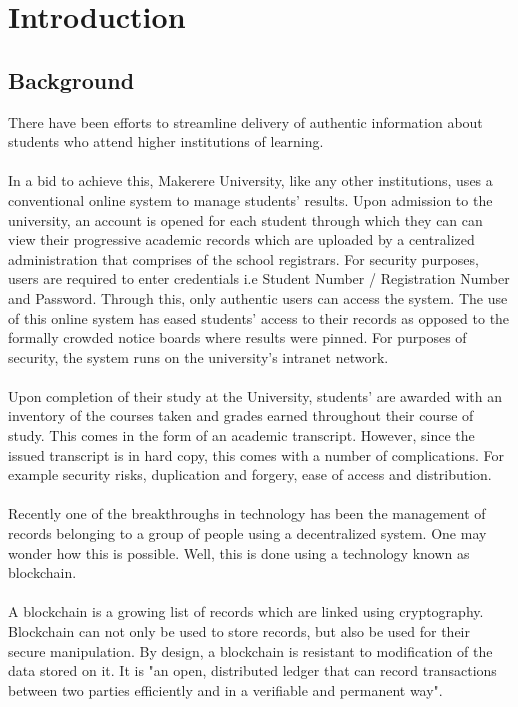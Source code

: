 \chapter{Introduction}

\section{Background}
There have been efforts to streamline delivery of authentic information about students who attend higher institutions of learning.\\\\
In a bid to achieve this, Makerere University, like any other institutions, uses a conventional online system to manage students' results. Upon admission to the university, an account is opened for each student through which they can can view their progressive academic records which are uploaded by a centralized administration that comprises of the school registrars. For security purposes, users are required to enter credentials i.e Student Number / Registration Number and Password. Through this, only authentic users can access the system. The use of this online system has eased students' access to their records as opposed to the formally crowded notice boards where results were pinned. For purposes of security, the system runs on the university's intranet network.\\\\
Upon completion of their study at the University, students' are awarded with an inventory of the courses taken and grades earned throughout their course of study. This comes in the form of an academic transcript. However, since the issued transcript is in hard copy, this comes with a number of complications. For example security risks, duplication and forgery, ease of access and distribution.\\\\
Recently one of the breakthroughs in technology has been the management of records belonging to a group of people using a decentralized system. One may wonder how this is possible. Well, this is done using a technology known as blockchain.\\\\
A blockchain is a growing list of records which are linked using cryptography\cite{art1}. Blockchain can not only be used to store records, but also be used for their secure manipulation. By design, a blockchain is resistant to modification of the data stored on it. It is "an open, distributed ledger that can record transactions between two parties efficiently and in a verifiable and permanent way".\\\\
